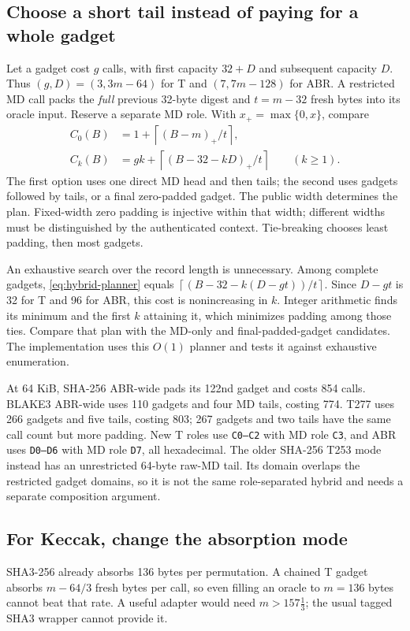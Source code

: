 \documentclass[11pt,letterpaper]{article}
\theoremstyle{definition} %
\newcommand{\ceil}[1]{\ensuremath{\left\lceil#1\right\rceil}}
\begin{document}
\subsection{Choose a short tail instead of paying for a whole gadget}
Let a gadget cost $g$ calls, with first capacity $32+D$ and subsequent
capacity $D$. Thus $(g,D)=(3,3m-64)$ for T and $(7,7m-128)$ for ABR.
A restricted MD call packs the \emph{full} previous 32-byte digest and
$t=m-32$ fresh bytes into its oracle input. Reserve a separate MD role.
With $x_+=\max\{0,x\}$, compare
\begin{align}
 C_0(B)&=1+\ceil{(B-m)_+/t},\nonumber\\
 C_k(B)&=gk+\ceil{(B-32-kD)_+/t}\qquad(k\geq1).
 \label{eq:hybrid-planner}
\end{align}
The first option uses one direct MD head and then tails; the second uses
gadgets followed by tails, or a final zero-padded gadget. The public width
determines the plan. Fixed-width zero padding is injective within that
width; different widths must be distinguished by the authenticated context.
Tie-breaking chooses least padding, then most gadgets.

An exhaustive search over the record length is unnecessary. Among complete
gadgets, \eqref{eq:hybrid-planner} equals
$\ceil{(B-32-k(D-gt))/t}$. Since $D-gt$ is 32 for T and 96 for ABR,
this cost is nonincreasing in $k$. Integer arithmetic finds its minimum
and the first $k$ attaining it, which minimizes padding among those ties.
Compare that plan with the MD-only and final-padded-gadget candidates.
The implementation uses this $O(1)$ planner and tests it against exhaustive
enumeration.

At 64 KiB, SHA-256 ABR-wide pads its 122nd gadget and costs 854 calls.
BLAKE3 ABR-wide uses 110 gadgets and four MD tails, costing 774.
T277 uses 266 gadgets and five tails, costing 803; 267 gadgets and two
tails have the same call count but more padding. New T roles use
\texttt{C0--C2} with MD role \texttt{C3}, and ABR uses
\texttt{D0--D6} with MD role \texttt{D7}, all hexadecimal.
The older SHA-256 T253 mode instead has an unrestricted 64-byte raw-MD
tail. Its domain overlaps the restricted gadget domains, so it is not the
same role-separated hybrid and needs a separate composition argument.

\subsection{For Keccak, change the absorption mode}
SHA3-256 already absorbs 136 bytes per permutation. A chained T gadget
absorbs $m-64/3$ fresh bytes per call, so even filling an oracle to
$m=136$ bytes cannot beat that rate. A useful adapter would need
$m>157\frac13$; the usual tagged SHA3 wrapper cannot provide it.
\end{document}
